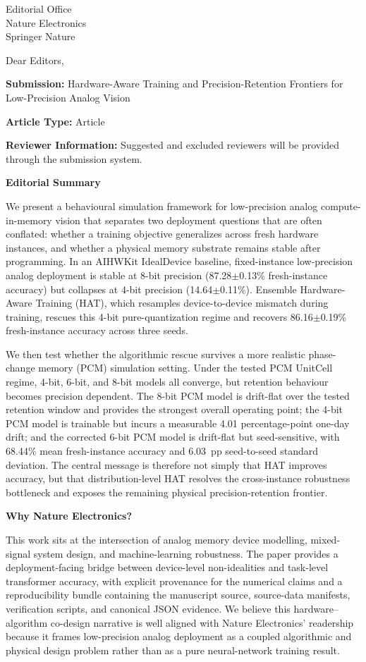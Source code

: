 \documentclass[11pt,a4paper]{letter}
\begin{document}
\begin{letter}{Editorial Office\\Nature Electronics\\Springer Nature}

\opening{Dear Editors,}

\textbf{Submission:} Hardware-Aware Training and Precision-Retention Frontiers for Low-Precision Analog Vision

\textbf{Article Type:} Article

\textbf{Reviewer Information:} Suggested and excluded reviewers will be provided through the submission system.

\vspace{0.5em}
\textbf{Editorial Summary}

We present a behavioural simulation framework for low-precision analog compute-in-memory vision that separates two deployment questions that are often conflated: whether a training objective generalizes across fresh hardware instances, and whether a physical memory substrate remains stable after programming. In an AIHWKit IdealDevice baseline, fixed-instance low-precision analog deployment is stable at 8-bit precision (87.28$\pm$0.13\% fresh-instance accuracy) but collapses at 4-bit precision (14.64$\pm$0.11\%). Ensemble Hardware-Aware Training (HAT), which resamples device-to-device mismatch during training, rescues this 4-bit pure-quantization regime and recovers 86.16$\pm$0.19\% fresh-instance accuracy across three seeds.

We then test whether the algorithmic rescue survives a more realistic phase-change memory (PCM) simulation setting. Under the tested PCM UnitCell regime, 4-bit, 6-bit, and 8-bit models all converge, but retention behaviour becomes precision dependent. The 8-bit PCM model is drift-flat over the tested retention window and provides the strongest overall operating point; the 4-bit PCM model is trainable but incurs a measurable 4.01 percentage-point one-day drift; and the corrected 6-bit PCM model is drift-flat but seed-sensitive, with 68.44\% mean fresh-instance accuracy and 6.03~pp seed-to-seed standard deviation. The central message is therefore not simply that HAT improves accuracy, but that distribution-level HAT resolves the cross-instance robustness bottleneck and exposes the remaining physical precision-retention frontier.

\vspace{0.5em}
\textbf{Why Nature Electronics?}

This work sits at the intersection of analog memory device modelling, mixed-signal system design, and machine-learning robustness. The paper provides a deployment-facing bridge between device-level non-idealities and task-level transformer accuracy, with explicit provenance for the numerical claims and a reproducibility bundle containing the manuscript source, source-data manifests, verification scripts, and canonical JSON evidence. We believe this hardware--algorithm co-design narrative is well aligned with Nature Electronics' readership because it frames low-precision analog deployment as a coupled algorithmic and physical design problem rather than as a pure neural-network training result.


\end{letter}
\end{document}
